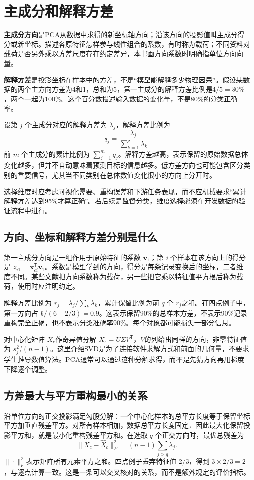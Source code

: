 \section{主成分和解释方差}

\textbf{主成分方向}是PCA从数据中求得的新坐标轴方向；沿该方向的投影值叫主成分得分或新坐标。描述各原特征怎样参与线性组合的系数，有时称为载荷；不同资料对载荷是否另外乘以方差尺度存在约定差异，本书画方向系数时明确指单位方向向量。

\textbf{解释方差}是投影坐标在样本中的方差，不是“模型能解释多少物理因果”。假设某数据的两个主方向方差为4和1，总和为5，第一主成分的解释方差比例是$4/5=80\%$，两个一起为100\%。这个百分数描述输入数据的变化量，不是80\%的分类正确率。

设第 $j$ 个主成分对应的解释方差为 $\lambda_j$，解释方差比例为
\begin{equation}
q_j=\frac{\lambda_j}{\sum_{k=1}^{p}\lambda_k}.
\end{equation}
前 $m$ 个主成分的累计比例为 $\sum_{j=1}^m q_j$。解释方差越高，表示保留的原始数据总体变化越多，但并不自动意味着预测目标的信息越多。低方差方向也可能包含区分类别的重要信号，尤其当不同类别在总体数值变化很小的方向上分开时。

选择维度时应考虑可视化需要、重构误差和下游任务表现，而不应机械要求“累计解释方差达到95\%才算正确”。若后续是监督分类，维度选择必须在开发数据的验证流程中进行。

\subsection{方向、坐标和解释方差分别是什么}
第一主成分方向是一组作用于原始特征的系数 $\mathbf v_1$；第 $i$ 个样本在该方向上的得分是 $z_{i1}=\mathbf x_{ci}^\mathsf T\mathbf v_1$。系数是模型学到的方向，得分是每条记录变换后的坐标，二者维度不同。某些文献把方向系数称为载荷，另一些把它乘以特征值平方根后称为载荷，使用时应注明约定。

解释方差比例为 $r_j=\lambda_j/\sum_k\lambda_k$，累计保留比例为前 $q$ 个 $r_j$之和。在四点例子中，第一方向占 $6/(6+2/3)=0.9$。这表示保留90\%的总样本方差，不表示90\%记录重构完全正确，也不表示分类准确率90\%。每个对象都可能损失一部分信息。

对中心化矩阵 $X_c$作奇异值分解 $X_c=U\Sigma V^\mathsf T$，$V$的列给出同样的方向，非零特征值为 $s_j^2/(n-1)$。这里介绍SVD是为了连接软件求解方式和前面的几何量，不要求学生推导数值算法。PCA通常可以通过这种分解求得，而不是先猜方向再用梯度下降逐个调整。

\subsection{方差最大与平方重构最小的关系}
沿单位方向的正交投影满足勾股分解：一个中心化样本的总平方长度等于保留坐标平方加垂直残差平方。对所有样本相加，数据总平方长度固定，因此最大化保留投影平方和，就是最小化重构残差平方和。在选取 $q$ 个正交方向时，最优总残差为
\[
\|X_c-\widehat X_c\|_F^2=(n-1)\sum_{j>q}\lambda_j.
\]
$\|\cdot\|_F^2$表示矩阵所有元素平方之和。四点例子丢弃特征值 $2/3$，得到 $3\times2/3=2$，与逐点计算一致。这是一条可以交叉核对的关系，而不是额外规定的评价指标。

